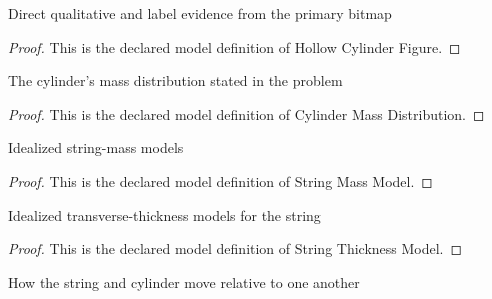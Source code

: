 \begin{definition}
  \label{def:physics:phyx-mini-0780:phyxminiproblems-problemphyxmini0780-hollowcylinderfigure}
  Direct qualitative and label evidence from the primary bitmap
\end{definition}
\begin{proof}
  This is the declared model definition of Hollow Cylinder Figure.
\end{proof}
\begin{definition}
  \label{def:physics:phyx-mini-0780:phyxminiproblems-problemphyxmini0780-cylindermassdistribution}
  The cylinder's mass distribution stated in the problem
\end{definition}
\begin{proof}
  This is the declared model definition of Cylinder Mass Distribution.
\end{proof}
\begin{definition}
  \label{def:physics:phyx-mini-0780:phyxminiproblems-problemphyxmini0780-stringmassmodel}
  Idealized string-mass models
\end{definition}
\begin{proof}
  This is the declared model definition of String Mass Model.
\end{proof}
\begin{definition}
  \label{def:physics:phyx-mini-0780:phyxminiproblems-problemphyxmini0780-stringthicknessmodel}
  Idealized transverse-thickness models for the string
\end{definition}
\begin{proof}
  This is the declared model definition of String Thickness Model.
\end{proof}
\begin{definition}
  \label{def:physics:phyx-mini-0780:phyxminiproblems-problemphyxmini0780-stringcontactregime}
  How the string and cylinder move relative to one another
\end{definition}
